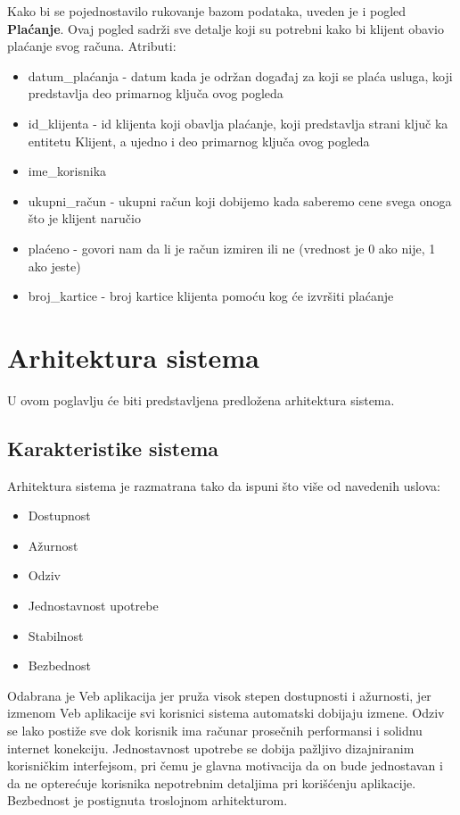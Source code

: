 \documentclass[a4paper]{article}
\begin{document}
Kako bi se pojednostavilo rukovanje bazom podataka, uveden je i pogled \textbf{Plaćanje}. Ovaj pogled sadrži sve detalje koji su potrebni kako bi klijent obavio plaćanje svog računa. Atributi:
\begin{itemize}
    \item datum\_plaćanja - datum kada je održan događaj za koji se plaća usluga, koji predstavlja deo primarnog ključa ovog pogleda
    \item id\_klijenta - id klijenta koji obavlja plaćanje, koji predstavlja strani ključ ka entitetu Klijent, a ujedno i deo primarnog ključa ovog pogleda
    \item ime\_korisnika 
    \item ukupni\_račun - ukupni račun koji dobijemo kada saberemo cene svega onoga što je klijent naručio
    \item plaćeno - govori nam da li je račun izmiren ili ne (vrednost je 0 ako nije, 1 ako jeste)
    \item broj\_kartice - broj kartice klijenta pomoću kog će izvršiti plaćanje
\end{itemize}

\section{Arhitektura sistema}
U ovom poglavlju će biti predstavljena predložena arhitektura sistema.

\subsection{Karakteristike sistema}
Arhitektura sistema je razmatrana tako da ispuni što više od navedenih uslova:
\begin{itemize}
    \item Dostupnost
    \item Ažurnost
    \item Odziv
    \item Jednostavnost upotrebe
    \item Stabilnost
    \item Bezbednost
\end{itemize}
Odabrana je Veb aplikacija jer pruža visok stepen dostupnosti i ažurnosti, jer izmenom Veb aplikacije svi korisnici sistema automatski dobijaju izmene. Odziv se lako postiže sve dok korisnik ima računar prosečnih performansi i solidnu internet konekciju. Jednostavnost upotrebe se dobija pažljivo dizajniranim korisničkim interfejsom, pri čemu je glavna motivacija da on bude jednostavan i da ne opterećuje korisnika nepotrebnim detaljima pri korišćenju aplikacije. Bezbednost je postignuta troslojnom arhitekturom.
\end{document}
